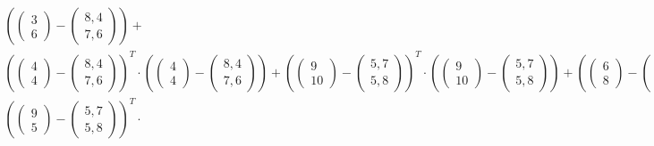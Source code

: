 \documentclass[a4paper,parskip=full-]{article}
\begin{document}
\begin{multline}
\left( \begin{pmatrix} 3 \\ 6 \end{pmatrix} - \begin{pmatrix} 8,4 \\ 7,6 \end{pmatrix} \right) + \\
\left( \begin{pmatrix} 4 \\ 4 \end{pmatrix} - \begin{pmatrix} 8,4 \\ 7,6 \end{pmatrix} \right)^T \cdot
\left( \begin{pmatrix} 4 \\ 4 \end{pmatrix} - \begin{pmatrix} 8,4 \\ 7,6 \end{pmatrix} \right) + 
\left( \begin{pmatrix}  9 \\ 10 \end{pmatrix} - \begin{pmatrix} 5,7 \\ 5,8 \end{pmatrix} \right)^T \cdot
\left( \begin{pmatrix}  9 \\ 10 \end{pmatrix} - \begin{pmatrix} 5,7 \\ 5,8 \end{pmatrix} \right) +
\left( \begin{pmatrix}  6 \\  8 \end{pmatrix} - \begin{pmatrix} 5,7 \\ 5,8 \end{pmatrix} \right)^T \cdot
\left( \begin{pmatrix}  6 \\  8 \end{pmatrix} - \begin{pmatrix} 5,7 \\ 5,8 \end{pmatrix} \right) + \\
\left( \begin{pmatrix}  9 \\  5 \end{pmatrix} - \begin{pmatrix} 5,7 \\ 5,8 \end{pmatrix} \right)^T \cdot

\end{multline}
\end{document}
